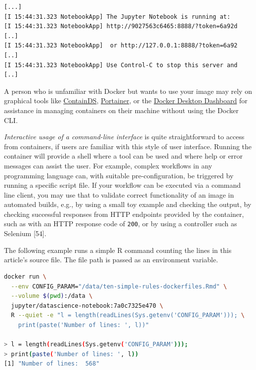 \documentclass[10pt,letterpaper]{article}
\begin{document}
\begin{verbatim}
[...]
[I 15:44:31.323 NotebookApp] The Jupyter Notebook is running at:
[I 15:44:31.323 NotebookApp] http://9027563c6465:8888/?token=6a92d [..]
[I 15:44:31.323 NotebookApp]  or http://127.0.0.1:8888/?token=6a92 [..]
[I 15:44:31.323 NotebookApp] Use Control-C to stop this server and [..]
\end{verbatim}

\normalsize

A person who is unfamiliar with Docker but wants to use your image may
rely on graphical tools like \href{https://containds.com/}{ContainDS},
\href{https://www.portainer.io/}{Portainer}, or the
\href{https://docs.docker.com/desktop/dashboard/}{Docker Desktop
Dashboard} for assistance in managing containers on their machine
without using the Docker CLI.

\emph{Interactive usage of a command-line interface} is quite
straightforward to access from containers, if users are familiar with
this style of user interface. Running the container will provide a shell
where a tool can be used and where help or error messages can assist the
user. For example, complex workflows in any programming language can,
with suitable pre-configuration, be triggered by running a specific
script file. If your workflow can be executed via a command line client,
you may use that to validate correct functionality of an image in
automated builds, e.g., by using a small toy example and checking the
output, by checking successful responses from HTTP endpoints provided by
the container, such as with an HTTP response code of \texttt{200}, or by
using a controller such as Selenium {[}54{]}.

The following example runs a simple R command counting the lines in this
article's source file. The file path is passed as an environment
variable.

\footnotesize

\begin{minipage}{\linewidth}

\begin{lstlisting}[language=bash,caption={Passing a parameter via environment variable; working code in example `pass-parameter-env`, see \nameref{examples}.},breaklines=true,label={lst:passparam}]
docker run \
  --env CONFIG_PARAM="/data/ten-simple-rules-dockerfiles.Rmd" \
  --volume $(pwd):/data \
  jupyter/datascience-notebook:7a0c7325e470 \
  R --quiet -e "l = length(readLines(Sys.getenv('CONFIG_PARAM'))); \
    print(paste('Number of lines: ', l))"

> l = length(readLines(Sys.getenv('CONFIG_PARAM')));
> print(paste('Number of lines: ', l))
[1] "Number of lines:  568"

\end{lstlisting}

\end{minipage}
\end{document}
